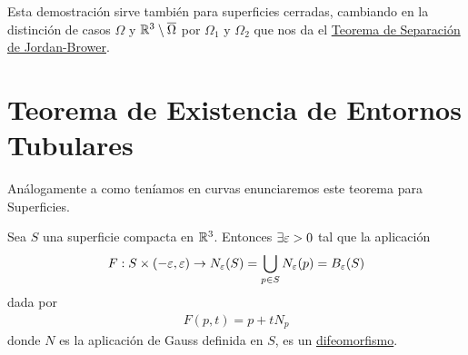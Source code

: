 \begin{observacion}
    Esta demostración sirve también para superficies cerradas, cambiando en la distinción de casos $\Omega$ y $\mathbb{R}^3 \setminus \overline{\Omega}$ por $\Omega_1$ y $\Omega_2$ que nos da el \hyperref[teo:sep_jordan_brower]{Teorema de Separación de Jordan-Brower}.
\end{observacion}

\section{Teorema de Existencia de Entornos Tubulares}

Análogamente a como teníamos en curvas enunciaremos este teorema para Superficies.

\begin{teo}
    Sea $S$ una superficie compacta en $\mathbb{R}^3$. Entonces $\exists \varepsilon> 0$ tal que la aplicación
    \begin{gather*}
        F : S \times (-\varepsilon, \varepsilon) \to N_\varepsilon(S) = \bigcup_{p\in S} N_\varepsilon(p) = B_\varepsilon(S)
    \end{gather*}
    dada por
    \begin{gather*}
        F(p,t) = p + tN_p
    \end{gather*}
    donde $N$ es la aplicación de Gauss definida en $S$, es un \underline{difeomorfismo}.
\end{teo}

